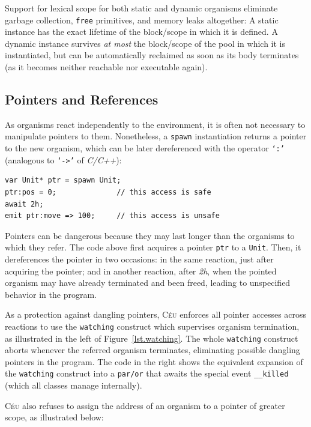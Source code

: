 \documentclass{sigplanconf}
\newcommand{\CEU}{\textsc{C\'{e}u}\xspace}
\newcommand{\code}[1] {{\small{\texttt{#1}}}}
\newcommand{\1}{\;}
\newcommand{\2}{\;\;}
\newcommand{\3}{\;\;\;}
\newcommand{\5}{\;\;\;\;\;}
\begin{document}
Support for lexical scope for both static and dynamic organisms eliminate 
garbage collection, \code{free} primitives, and memory leaks altogether:
A static instance has the exact lifetime of the block/scope in which it is 
defined.
A dynamic instance survives \emph{at most} the block/scope of the pool in which 
it is instantiated, but can be automatically reclaimed as soon as its body 
terminates (as it becomes neither reachable nor executable again).


\subsection{Pointers and References}
\label{sec.orgs.refs}

As organisms react independently to the environment, it is often not necessary 
to manipulate pointers to them.
%
Nonetheless, a \code{spawn} instantiation returns a pointer to the new 
organism, which can be later dereferenced with the operator \code{`:'} 
(analogous to \code{`->'} of \emph{C/C++}):

\begin{lstlisting}
var Unit* ptr = spawn Unit;
ptr:pos = 0;              // this access is safe
await 2h;
emit ptr:move => 100;     // this access is unsafe
\end{lstlisting}

Pointers can be dangerous because they may last longer than the organisms to 
which they refer.
%
The code above first acquires a pointer \code{ptr} to a \code{Unit}.
Then, it dereferences the pointer in two occasions:
in the same reaction, just after acquiring the pointer;
and in another reaction, after \emph{2h}, when the pointed organism may have 
already terminated and been freed, leading to unspecified behavior in the 
program.

As a protection against dangling pointers, \CEU enforces all pointer accesses 
across reactions to use the \code{watching} construct which supervises organism 
termination, as illustrated in the left of Figure~\ref{lst.watching}.
%
The whole \code{watching} construct aborts whenever the referred organism 
terminates, eliminating possible dangling pointers in the program.
%
The code in the right shows the equivalent expansion of the \code{watching} 
construct into a \code{par/or} that awaits the special event \code{\_\_killed} 
(which all classes manage internally).

\CEU also refuses to assign the address of an organism to a pointer of greater 
scope, as illustrated below:
\end{document}
